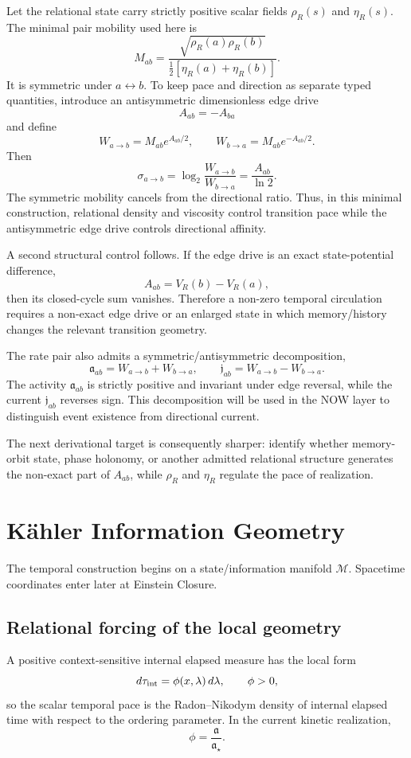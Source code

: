Let the relational state carry strictly positive scalar fields $\rho_R(s)$ and $\eta_R(s)$. The minimal pair mobility used here is
\[
\boxed{
M_{ab}
=
\frac{\sqrt{\rho_R(a)\rho_R(b)}}
{\tfrac12[\eta_R(a)+\eta_R(b)]}.
}
\]
It is symmetric under $a\leftrightarrow b$. To keep pace and direction as separate typed quantities, introduce an antisymmetric dimensionless edge drive
\[
A_{ab}=-A_{ba}
\]
and define
\[
\boxed{
W_{a\to b}=M_{ab}e^{A_{ab}/2},
\qquad
W_{b\to a}=M_{ab}e^{-A_{ab}/2}.
}
\]
Then
\[
\sigma_{a\to b}
=
\log_2\frac{W_{a\to b}}{W_{b\to a}}
=
\frac{A_{ab}}{\ln2}.
\]
The symmetric mobility cancels from the directional ratio. Thus, in this minimal construction, relational density and viscosity control transition pace while the antisymmetric edge drive controls directional affinity.

A second structural control follows. If the edge drive is an exact state-potential difference,
\[
A_{ab}=V_R(b)-V_R(a),
\]
then its closed-cycle sum vanishes. Therefore a non-zero temporal circulation requires a non-exact edge drive or an enlarged state in which memory/history changes the relevant transition geometry.

The rate pair also admits a symmetric/antisymmetric decomposition,
\[
\mathfrak a_{ab}=W_{a\to b}+W_{b\to a},
\qquad
\mathfrak j_{ab}=W_{a\to b}-W_{b\to a}.
\]
The activity $\mathfrak a_{ab}$ is strictly positive and invariant under edge reversal, while the current $\mathfrak j_{ab}$ reverses sign. This decomposition will be used in the NOW layer to distinguish event existence from directional current.

The next derivational target is consequently sharper: identify whether memory-orbit state, phase holonomy, or another admitted relational structure generates the non-exact part of $A_{ab}$, while $\rho_R$ and $\eta_R$ regulate the pace of realization.


\chapter{Kähler Information Geometry}
The temporal construction begins on a state/information manifold \(\mathcal M\). Spacetime coordinates enter later at Einstein Closure.

\section{Relational forcing of the local geometry}
A positive context-sensitive internal elapsed measure has the local form
\[
 d\tau_{\rm int}=\phi(x,\lambda)\,d\lambda,
 \qquad \phi>0,
\]
so the scalar temporal pace is the Radon--Nikodym density of internal elapsed time with respect to the ordering parameter. In the current kinetic realization,
\[
\boxed{\phi=\frac{\mathfrak a}{\mathfrak a_\star}.}
\]

